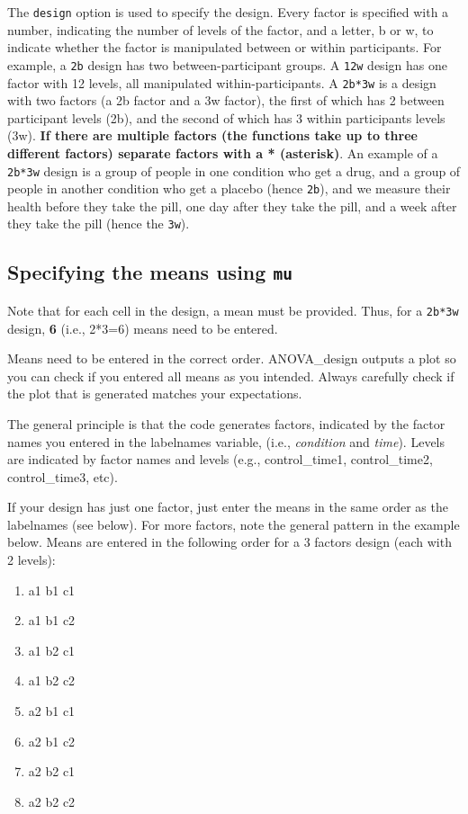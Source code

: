 \documentclass[]{book}
\providecommand{\tightlist}{%
  \setlength{\itemsep}{0pt}\setlength{\parskip}{0pt}}
\begin{document}
The \texttt{design} option is used to specify the design.
Every factor is specified with a number, indicating the number of levels of the factor, and a letter, b or w, to indicate whether the factor is manipulated between or within participants.
For example, a \texttt{2b} design has two between-participant groups.
A \texttt{12w} design has one factor with 12 levels, all manipulated within-participants.
A \texttt{2b*3w} is a design with two factors (a 2b factor and a 3w factor), the first of which has 2 between participant levels (2b), and the second of which has 3 within participants levels (3w).
\textbf{If there are multiple factors (the functions take up to three different factors) separate factors with a * (asterisk)}.
An example of a \texttt{2b*3w} design is a group of people in one condition who get a drug, and a group of people in another condition who get a placebo (hence \texttt{2b}), and we measure their health before they take the pill, one day after they take the pill, and a week after they take the pill (hence the \texttt{3w}).

\hypertarget{specifying-the-means-using-mu}{%
\subsection{\texorpdfstring{Specifying the means using \texttt{mu}}{Specifying the means using mu}}\label{specifying-the-means-using-mu}}

Note that for each cell in the design, a mean must be provided. Thus, for a \texttt{2b*3w} design, \textbf{6} (i.e., 2*3=6) means need to be entered.

Means need to be entered in the correct order. ANOVA\_design outputs a plot so you can check if you entered all means as you intended. Always carefully check if the plot that is generated matches your expectations.

The general principle is that the code generates factors, indicated by the factor names you entered in the labelnames variable, (i.e., \emph{condition} and \emph{time}). Levels are indicated by factor names and levels (e.g., control\_time1, control\_time2, control\_time3, etc).

If your design has just one factor, just enter the means in the same order as the labelnames (see below). For more factors, note the general pattern in the example below. Means are entered in the following order for a 3 factors design (each with 2 levels):

\begin{enumerate}
\def\labelenumi{\arabic{enumi}.}
\tightlist
\item
  a1 b1 c1
\item
  a1 b1 c2
\item
  a1 b2 c1
\item
  a1 b2 c2
\item
  a2 b1 c1
\item
  a2 b1 c2
\item
  a2 b2 c1
\item
  a2 b2 c2
\end{enumerate}
\end{document}
